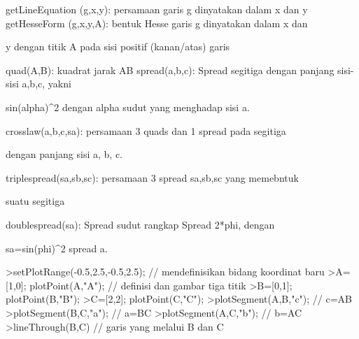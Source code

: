 \documentclass[a4paper,10pt]{article}
\begin{document}
\begin{eulernotebook}
\begin{eulercomment}
\begin{eulercomment}
\begin{eulercomment}
\begin{eulercomment}
\begin{eulercomment}
\end{eulercomment}
\begin{eulerttcomment}
  getLineEquation (g,x,y): persamaan garis g dinyatakan dalam x dan y
  getHesseForm (g,x,y,A): bentuk Hesse garis g dinyatakan dalam x dan
\end{eulerttcomment}
\begin{eulercomment}
y dengan titik A pada sisi positif (kanan/atas) garis\\
\end{eulercomment}
\begin{eulerttcomment}
  quad(A,B): kuadrat jarak AB
  spread(a,b,c): Spread segitiga dengan panjang sisi-sisi a,b,c, yakni
\end{eulerttcomment}
\begin{eulercomment}
sin(alpha)\textasciicircum{}2 dengan alpha sudut yang menghadap sisi a.\\
\end{eulercomment}
\begin{eulerttcomment}
  crosslaw(a,b,c,sa): persamaan 3 quads dan 1 spread pada segitiga
\end{eulerttcomment}
\begin{eulercomment}
dengan panjang sisi a, b, c.\\
\end{eulercomment}
\begin{eulerttcomment}
  triplespread(sa,sb,sc): persamaan 3 spread sa,sb,sc yang memebntuk
\end{eulerttcomment}
\begin{eulercomment}
suatu segitiga\\
\end{eulercomment}
\begin{eulerttcomment}
  doublespread(sa): Spread sudut rangkap Spread 2*phi, dengan
\end{eulerttcomment}
\begin{eulercomment}
sa=sin(phi)\textasciicircum{}2 spread a.
\end{eulercomment}
\begin{eulerprompt}
>setPlotRange(-0.5,2.5,-0.5,2.5); // mendefinisikan bidang koordinat baru
>A=[1,0]; plotPoint(A,"A"); // definisi dan gambar tiga titik
>B=[0,1]; plotPoint(B,"B");
>C=[2,2]; plotPoint(C,"C");
>plotSegment(A,B,"c"); // c=AB
>plotSegment(B,C,"a"); // a=BC
>plotSegment(A,C,"b"); // b=AC
>lineThrough(B,C) // garis yang melalui B dan C
\end{eulerprompt}
\begin{euleroutput}

\end{euleroutput}
\end{eulercomment}
\end{eulercomment}
\end{eulercomment}
\end{eulercomment}
\end{eulernotebook}
\end{document}
